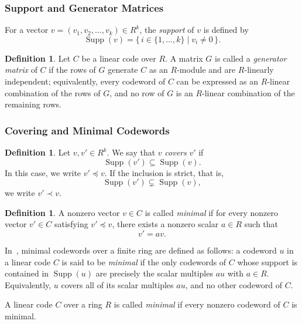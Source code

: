 \documentclass[10pt]{article}
\theoremstyle{definition}
\newtheorem{definition}[lem]{Definition}
\begin{document}
\subsubsection{Support and Generator Matrices}

For a vector $v = (v_1, v_2, \dots, v_k) \in R^k$, the \emph{support} of $v$ is defined by
\[
\operatorname{Supp}(v) = \{\, i \in \{1, \dots, k\} \mid v_i \neq 0 \,\}.
\]

\begin{definition}\cite{Norton}
Let $C$ be a linear code over $R$. A matrix $G$ is called a \emph{generator matrix} of $C$ if the rows of $G$ generate $C$ as an $R$-module and are $R$-linearly independent; equivalently, every codeword of $C$ can be expressed as an $R$-linear combination of the rows of $G$, and no row of $G$ is an $R$-linear combination of the remaining rows.
\end{definition}

\subsubsection{Covering and Minimal Codewords}

\begin{definition}\cite{AshikhminBarg}
Let $v, v' \in R^k$. We say that $v$ \emph{covers} $v'$ if
\[
\operatorname{Supp}(v') \subseteq \operatorname{Supp}(v).
\]
In this case, we write $v' \preceq v$. If the inclusion is strict, that is,
\[
\operatorname{Supp}(v') \subsetneq \operatorname{Supp}(v),
\]
we write $v' \prec v$.
\end{definition}

\begin{definition}\cite{AshikhminBarg}
A nonzero vector $v \in C$ is called \emph{minimal} if for every nonzero vector $v' \in C$ satisfying $v' \preceq v$, there exists a nonzero scalar $a \in R$ such that
\[
v' = a v.
\]
\end{definition}

In~\cite{MajiMesnager}, minimal codewords over a finite ring are defined as follows: a codeword $u$ in a linear code $C$ is said to be \emph{minimal} if the only codewords of $C$ whose support is contained in $\operatorname{Supp}(u)$ are precisely the scalar multiples $a u$ with $a \in R$. Equivalently, $u$ covers all of its scalar multiples $a u$, and no other codeword of $C$.

A linear code $C$ over a ring $R$ is called \emph{minimal} if every nonzero codeword of $C$ is minimal.
\end{document}
